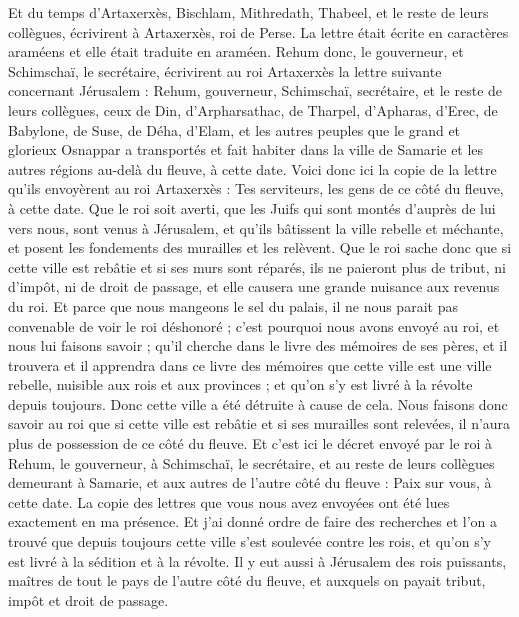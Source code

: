 \begin{multicols}{2}
Et du temps d'Artaxerxès, Bischlam, Mithredath, Thabeel, et le reste de leurs collègues, écrivirent à Artaxerxès, roi de Perse. La lettre était écrite en caractères araméens et elle était traduite en araméen.
Rehum donc, le gouverneur, et Schimschaï, le secrétaire, écrivirent au roi Artaxerxès la lettre suivante concernant Jérusalem :
Rehum, gouverneur, Schimschaï, secrétaire, et le reste de leurs collègues, ceux de Din, d'Arpharsathac, de Tharpel, d'Apharas, d'Erec, de Babylone, de Suse, de Déha, d'Elam,
et les autres peuples que le grand et glorieux Osnappar a transportés et fait habiter dans la ville de Samarie et les autres régions au-delà du fleuve, à cette date.
Voici donc ici la copie de la lettre qu'ils envoyèrent au roi Artaxerxès : Tes serviteurs, les gens de ce côté du fleuve, à cette date.
Que le roi soit averti, que les Juifs qui sont montés d'auprès de lui vers nous, sont venus à Jérusalem, et qu'ils bâtissent la ville rebelle et méchante, et posent les fondements des murailles et les relèvent. 
Que le roi sache donc que si cette ville est rebâtie et si ses murs sont réparés, ils ne paieront plus de tribut, ni d'impôt, ni de droit de passage, et elle causera une grande nuisance aux revenus du roi.
Et parce que nous mangeons le sel du palais, il ne nous parait pas convenable de voir le roi déshonoré ; c'est pourquoi nous avons envoyé au roi, et nous lui faisons savoir ;
qu'il cherche dans le livre des mémoires de ses pères, et il trouvera et il apprendra dans ce livre des mémoires que cette ville est une ville rebelle, nuisible aux rois et aux provinces ; et qu'on s'y est livré à la révolte depuis toujours. Donc cette ville a été détruite à cause de cela.
Nous faisons donc savoir au roi que si cette ville est rebâtie et si ses murailles sont relevées, il n'aura plus de possession de ce côté du fleuve.
Et c'est ici le décret envoyé par le roi à Rehum, le gouverneur, à Schimschaï, le secrétaire, et au reste de leurs collègues demeurant à Samarie, et aux autres de l'autre côté du fleuve : Paix sur vous, à cette date.
La copie des lettres que vous nous avez envoyées ont été lues exactement en ma présence.
Et j'ai donné ordre de faire des recherches et l'on a trouvé que depuis toujours cette ville s'est soulevée contre les rois, et qu'on s'y est livré à la sédition et à la révolte.
Il y eut aussi à Jérusalem des rois puissants, maîtres de tout le pays de l'autre côté du fleuve, et auxquels on payait tribut, impôt et droit de passage.

\end{multicols}
